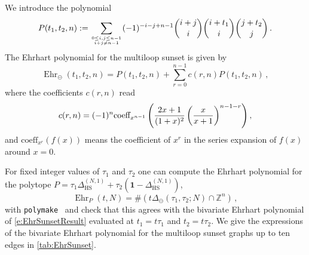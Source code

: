 \documentclass[12pt,a4paper]{article}
\theoremstyle{plain}
\theoremstyle{remark}
\newcommand{\nprops}{N}
\newcommand{\Newton}{\Delta}
\DeclareMathOperator{\ehr}{Ehr}
\newcommand{\simplexwithpars}[1]{\Newton_{\text{HS}}^{(#1)}}
\begin{document}
\medskip

We introduce the polynomial
\begin{equation}
  P(t_1,t_2,n):=  \sum_{0\leq i,j\leq n-1\atop i+j\neq
    n-1}(-1)^{-i-j+n-1} \binom{i+j}{i} \binom{i+t_1}{i} \binom{j+t_2}{j} \,.
\end{equation}
%
The Ehrhart polynomial for the multiloop sunset is given by
\begin{equation}\label{e:EhrSunsetResult}
    \ehr_{\circleddash}(t_1,t_2,n)=P(t_1,t_2,n)+\sum_{r=0}^{n-1} c(r,n) P(t_1,t_2,n)\,,
\end{equation}
where the coefficients $c(r,n)$ read~\cite[A097808]{oeis}
\begin{equation}
 c(r,n)=(-1)^n \textrm{coeff}_{x^{n-1}}   \left({2 x+1\over (1+x)^2}  \left(\frac{x}{x+1}\right)^{n-1-r}\right),
\end{equation}
and $\textrm{coeff}_{x^{r}}(f(x))$ means the coefficient of
$x^r$ in the series expansion of $f(x)$ around $x=0$.

\medskip

For fixed integer values of $\tau_1$ and $\tau_2$
one can compute the Ehrhart polynomial for the polytope $P=\tau_1\simplexwithpars{\nprops,1}+\tau_2 ( \mathbf{1} - \simplexwithpars{\nprops,1})$,
\begin{equation}
\ehr_P(t,\nprops)=  \#\left(t\Delta_{\circleddash}(\tau_1,\tau_2;\nprops) \cap \mathbb Z^n\right) \,,
\end{equation}
with {\tt polymake}~\cite{polymake:FPSAC_2009} and check that this
agrees with the bivariate Ehrhart polynomial of \cref{e:EhrSunsetResult} evaluated at $t_1=t \tau_1$ and $t_2=t\tau_2$.
We give the expressions of the bivariate Ehrhart polynomial for the multiloop sunset graphs up to ten edges in \cref{tab:EhrSunset}.
\end{document}
